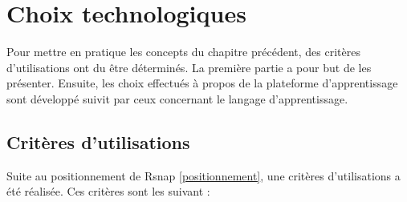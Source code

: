 \section{Choix technologiques}
\label{techno}
Pour mettre en pratique les concepts du chapitre précédent, des critères d'utilisations ont du être déterminés. La première partie a pour but de les présenter. Ensuite, les choix effectués à propos de la plateforme d'apprentissage sont développé suivit par ceux concernant le langage d'apprentissage.

\subsection{Critères d'utilisations}
Suite au positionnement de \gls{Rsnap} \ref{positionnement}, une critères d'utilisations a été réalisée. Ces critères sont les suivant :

